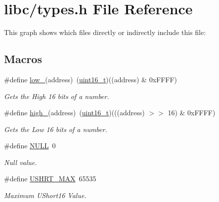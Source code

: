 \hypertarget{a00104}{}\section{libc/types.h File Reference}
\label{a00104}
This graph shows which files directly or indirectly include this file\+:
\subsection*{Macros}
\begin{DoxyCompactItemize}
\item 
\#define \hyperlink{a00104_aded7ad58a4bedfffea10d5ae9c0c817e_aded7ad58a4bedfffea10d5ae9c0c817e}{low\+\_}(address)~(\hyperlink{a00104_a273cf69d639a59973b6019625df33e30_a273cf69d639a59973b6019625df33e30}{uint16\+\_\+t})((address) \& 0x\+F\+F\+F\+F)
\begin{DoxyCompactList}\small\item\em Gets the High 16 bits of a number. \end{DoxyCompactList}\item 
\#define \hyperlink{a00104_a0a63db19c3e2153ed419aeccf4e33c92_a0a63db19c3e2153ed419aeccf4e33c92}{high\+\_}(address)~(\hyperlink{a00104_a273cf69d639a59973b6019625df33e30_a273cf69d639a59973b6019625df33e30}{uint16\+\_\+t})(((address) $>$$>$ 16) \& 0x\+F\+F\+F\+F)
\begin{DoxyCompactList}\small\item\em Gets the Low 16 bits of a number. \end{DoxyCompactList}\item 
\#define \hyperlink{a00104_a070d2ce7b6bb7e5c05602aa8c308d0c4_a070d2ce7b6bb7e5c05602aa8c308d0c4}{N\+U\+LL}~0
\begin{DoxyCompactList}\small\item\em Null value. \end{DoxyCompactList}\item 
\#define \hyperlink{a00104_a689b119da994dece91d44b5aeac643ed_a689b119da994dece91d44b5aeac643ed}{U\+S\+H\+R\+T\+\_\+\+M\+AX}~65535
\begin{DoxyCompactList}\small\item\em Maximum U\+Short16 Value. \end{DoxyCompactList}\end{DoxyCompactItemize}
